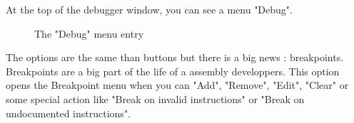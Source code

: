 \documentclass[10pt]{report}
\begin{document}
At the top of the debugger window, you can see a menu "Debug".\newline
\begin{figure}[H]
\centering
{}
\caption{The "Debug" menu entry}
\end{figure}
The options are the same than buttons but there is a big news : breakpoints.\newline
Breakpoints are a big part of the life of a assembly developpers.\newline
This option opens the Breakpoint menu when you can "Add", "Remove", "Edit", "Clear" or some special action like "Break on invalid instructions" or "Break on undocumented instructions".\newline
\end{document}
